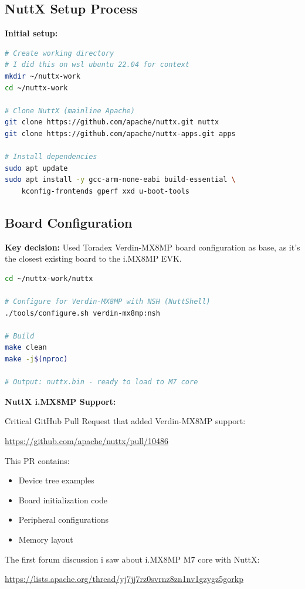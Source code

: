 \documentclass[12pt,a4paper]{report}
\begin{document}
\subsection{NuttX Setup Process}

\textbf{Initial setup:}

\begin{lstlisting}[language=bash]
# Create working directory
# I did this on wsl ubuntu 22.04 for context
mkdir ~/nuttx-work
cd ~/nuttx-work

# Clone NuttX (mainline Apache)
git clone https://github.com/apache/nuttx.git nuttx
git clone https://github.com/apache/nuttx-apps.git apps

# Install dependencies
sudo apt update
sudo apt install -y gcc-arm-none-eabi build-essential \
    kconfig-frontends gperf xxd u-boot-tools
\end{lstlisting}

\subsection{Board Configuration}

\textbf{Key decision:} Used Toradex Verdin-MX8MP board configuration as base, as it's the closest existing board to the i.MX8MP EVK.

\begin{lstlisting}[language=bash]
cd ~/nuttx-work/nuttx

# Configure for Verdin-MX8MP with NSH (NuttShell)
./tools/configure.sh verdin-mx8mp:nsh

# Build
make clean
make -j$(nproc)

# Output: nuttx.bin - ready to load to M7 core
\end{lstlisting}

\begin{docref}
\textbf{NuttX i.MX8MP Support:}

Critical GitHub Pull Request that added Verdin-MX8MP support:

\url{https://github.com/apache/nuttx/pull/10486}

This PR contains:
\begin{itemize}
    \item Device tree examples
    \item Board initialization code
    \item Peripheral configurations
    \item Memory layout
\end{itemize}

The first forum discussion i saw  about i.MX8MP M7 core with NuttX:

\url{https://lists.apache.org/thread/yj7jj7rz0svrnz8zn1nv1gzygz5gorkp}
\end{docref}
\end{document}
